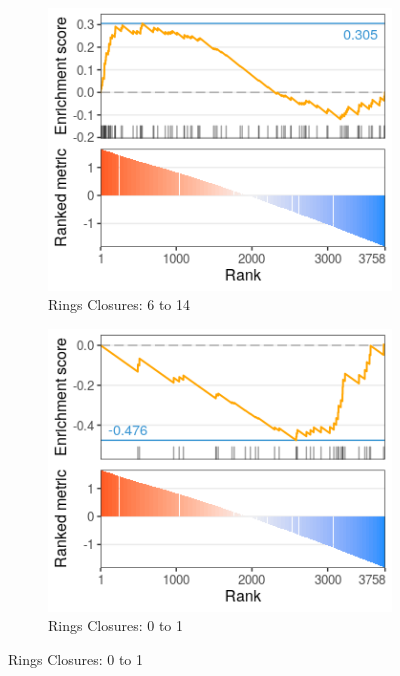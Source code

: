\begin{figure}[!ht]
	\centering
	\begin{subfigure}[h]{0.32\textwidth}
		\includegraphics[width=\textwidth]{images/ctrap/molecular-descriptors-a}
		\caption{\footnotesize{Rings Closures: 6 to 14}}
	\end{subfigure}
	\begin{subfigure}[h]{0.32\textwidth}
		\includegraphics[width=\textwidth]{images/ctrap/molecular-descriptors-b}
		\caption{\footnotesize{Rings Closures: 0 to 1}}
	\end{subfigure}

\end{figure}

